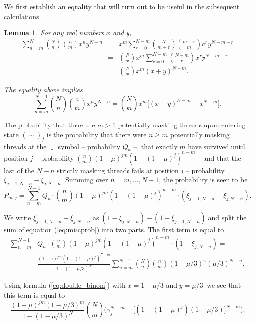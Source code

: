 \documentclass{article}
\newtheorem{lemma}{Lemma}
\begin{document}
We first establish an equality that will turn out to be useful in the
subsequent calculations.

\begin{lemma}
For any real numbers $x$ and $y$,
\begin{eqnarray*}
\sum_{n=m}^N {N \choose n} {n \choose m} x^n y^{N-n}
&=& x^m \sum_{r=0}^{N-m} {N \choose m+r} {m+r \choose m}a^r y^{N-m-r} \\
&=& {N \choose m} x^m \sum_{r=0}^{N-m} {N-m \choose r}x^r y^{N-m-r} \\
&=& {N \choose m} x^m (x+y)^{N-m}.
\end{eqnarray*}

The equality above implies
\begin{equation}
\label{eq:double_binom}
\sum_{n=m}^{N-1} {N \choose n} {n \choose m} x^n y^{N-n} =
{N \choose m} x^m \Big[ (x+y)^{N-m} - x^{N-m} \Big].
\end{equation}
\end{lemma}

The probability that there are $m>1$ potentially masking threads upon
entering state $(\sim)_j$ is the probability that there were $n \geq m$
potentially masking threads at the $\downarrow$ symbol -- probability
$Q_n$ --, that exactly $m$ have survived until position $j$ -- probability
${n \choose m} (1-\mu)^{jm} (1-(1-\mu)^j)^{n-m}$ -- and that the last of
the $N-n$ strictly masking threads fails at position $j$ -- probability
$\xi_{j-1,N-n}-\xi_{j,N-n}$. Summing over $n = m, \ldots, N-1$, the
probability is seen to be
\begin{equation}
\label{eq:miscprob}
P_{m,j} = \sum_{n=m}^{N-1} Q_n \cdot {n \choose m} (1-\mu)^{jm}
(1-(1-\mu)^j)^{n-m} \cdot (\xi_{j-1,N-n}-\xi_{j,N-n}).
\end{equation}

We write $\xi_{j-1,N-n}-\xi_{j,N-n}$ as $(1-\xi_{j,N-n}) -
(1-\xi_{j-1,N-n})$ and split the sum of equation (\ref{eq:miscprob}) into
two parts. The first term is equal to
\begin{equation*}
\begin{split}
\sum_{n=m}^{N-1} & Q_n \cdot {n \choose m} (1-\mu)^{jm} (1-(1-\mu)^j)^{n-m}
\cdot (1 - \xi_{j,N-n}) = \\
& \frac{(1-\mu)^{jm} (1-(1-\mu)^j)^{N-m}}{1-(1-\mu/3)^N}
\sum_{n=m}^{N-1} {N \choose n} {n \choose m} (1-\mu/3)^n (\mu/3)^{N-n}.
\end{split}
\end{equation*}

Using formula (\ref{eq:double_binom}) with $x=1-\mu/3$ and $y=\mu/3$, we
see that this term is equal to
\begin{equation*}
\frac{(1-\mu)^{jm} (1-\mu/3)^m}{1-(1-\mu/3)^N} {N \choose m} 
\bigg( \gamma_j^{N-m}
-\big[ (1-(1-\mu)^j)(1-\mu/3)\big]^{N-m} \bigg).
\end{equation*}
\end{document}
